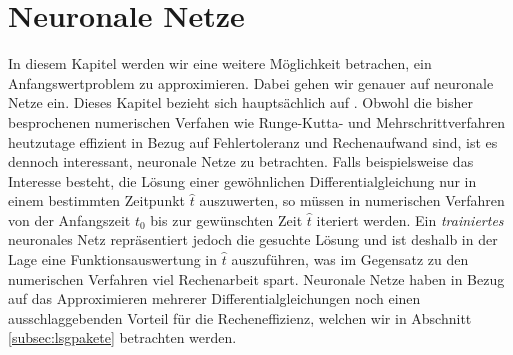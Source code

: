 \section{Neuronale Netze}
\label{sec:neuralnet}
In diesem Kapitel werden wir eine weitere Möglichkeit betrachen, ein Anfangswertproblem zu approximieren.
Dabei gehen wir genauer auf neuronale Netze ein. Dieses Kapitel bezieht sich hauptsächlich auf
\cite{calinDeepLearningArchitectures}. Obwohl die bisher besprochenen numerischen Verfahen wie Runge-Kutta- und
Mehrschrittverfahren heutzutage effizient in Bezug auf Fehlertoleranz und Rechenaufwand sind, ist es dennoch interessant,
neuronale Netze zu betrachten. Falls beispielsweise das Interesse besteht, die Lösung einer gewöhnlichen
Differentialgleichung nur in einem bestimmten Zeitpunkt $\hat{t}$ auszuwerten, so müssen in numerischen Verfahren von
der Anfangszeit $t_0$ bis zur gewünschten Zeit $\hat{t}$ iteriert werden. Ein \textit{trainiertes} neuronales Netz
repräsentiert jedoch die gesuchte Lösung und ist deshalb in der Lage eine Funktionsauswertung in $\hat{t}$ auszuführen,
was im Gegensatz zu den numerischen Verfahren viel Rechenarbeit spart. Neuronale Netze haben in Bezug auf das
Approximieren mehrerer Differentialgleichungen noch einen ausschlaggebenden Vorteil für die Recheneffizienz, welchen
wir in Abschnitt \ref{subsec:lsgpakete} betrachten werden.

